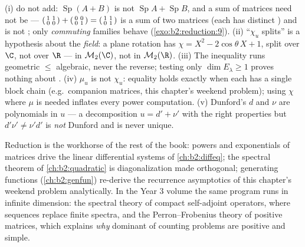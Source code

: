 \begin{remark}\label{rem:b2:reduction:pitfalls}
(i)  do not add: $\operatorname{Sp}(A + B)$ is not
$\operatorname{Sp}A + \operatorname{Sp}B$, and a sum of
 matrices need not be  ---
$\begin{psmallmatrix}1 & 1\\ 0 & 0\end{psmallmatrix} +
\begin{psmallmatrix}0 & 0\\ 0 & 1\end{psmallmatrix} =
\begin{psmallmatrix}1 & 1\\ 0 & 1\end{psmallmatrix}$ is a sum of
two  matrices (each has distinct ) and
is not ; only \emph{commuting} families behave
(\cref{exo:b2:reduction:9}). (ii) ``$\chi_u$ splits'' is a
hypothesis about the \emph{field}: a plane rotation has $\chi =
X^2 - 2\cos\theta\,X + 1$, split over $\C$, not over $\R$ ---
 in $\mathcal{M}_2(\C)$, not  in
$\mathcal{M}_2(\R)$. (iii) The inequality runs geometric $\leq$
algebraic, never the reverse; testing only $\dim E_\lambda \geq
1$ proves nothing about . (iv) $\mu_u$ is not
$\chi_u$: equality holds exactly when each  has a
single block chain (e.g.\ companion matrices, this chapter's
weekend problem); using $\chi$ where $\mu$ is needed inflates
every power computation. (v) Dunford's $d$ and $\nu$ are
polynomials in $u$ --- a decomposition $u = d' + \nu'$ with the
right properties but $d'\nu' \neq \nu'd'$ is \emph{not} Dunford
and is never unique.
\end{remark}

\begin{remark}
Reduction is the workhorse of the rest of the book: powers and
exponentials of matrices drive the linear differential systems of
\cref{ch:b2:diffeq}; the spectral theorem of \cref{ch:b2:quadratic}
is diagonalization made orthogonal; generating functions
(\cref{ch:b2:genfun}) re-derive the recurrence asymptotics of this
chapter's weekend problem analytically. In the Year 3 volume the
same program runs in infinite dimension: the spectral theory of
compact self-adjoint operators, where  sequences replace
finite spectra, and the Perron--Frobenius theory of positive
matrices, which explains \emph{why} dominant  of
counting problems are positive and simple.
\end{remark}

